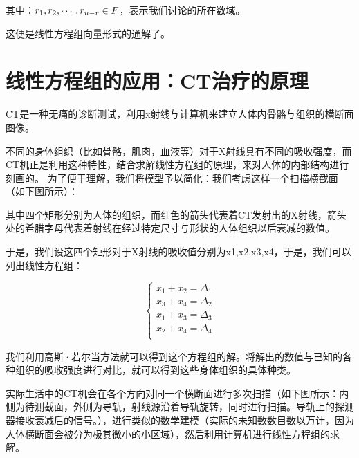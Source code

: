 \documentclass[a4paper]{ctexart}
\begin{document}
其中：$r_{1},r_{2},\cdots,r_{n-r} \in \mit{F}$，表示我们讨论的所在数域。

这便是线性方程组向量形式的通解了。

\section{线性方程组的应用：CT治疗的原理}
CT是一种无痛的诊断测试，利用x射线与计算机来建立人体内骨骼与组织的横断面图像。

不同的身体组织（比如骨骼，肌肉，血液等）对于X射线具有不同的吸收强度，而CT机正是利用这种特性，结合求解线性方程组的原理，来对人体的内部结构进行刻画的。
为了便于理解，我们将模型予以简化：我们考虑这样一个扫描横截面（如下图所示）：

  

其中四个矩形分别为人体的组织，而红色的箭头代表着CT发射出的X射线，箭头处的希腊字母代表着射线在经过特定尺寸与形状的人体组织以后衰减的数值。

于是，我们设这四个矩形对于X射线的吸收值分别为x1,x2,x3,x4，于是，我们可以列出线性方程组：

  $$
  \begin{cases}
  x_1+x_2=\Delta_1\\
  x_3+x_4=\Delta_2\\
  x_1+x_3=\Delta_3\\
  x_2+x_4=\Delta_4\\
  \end{cases}
  $$

我们利用高斯·若尔当方法就可以得到这个方程组的解。将解出的数值与已知的各种组织的吸收强度进行对比，就可以得到这些身体组织的具体种类。

实际生活中的CT机会在各个方向对同一个横断面进行多次扫描（如下图所示：内侧为待测截面，外侧为导轨，射线源沿着导轨旋转，同时进行扫描。导轨上的探测器接收衰减后的信号。），进行类似的数学建模（实际的未知数数目数以万计，因为人体横断面会被分为极其微小的小区域），然后利用计算机进行线性方程组的求解。
\end{document}
